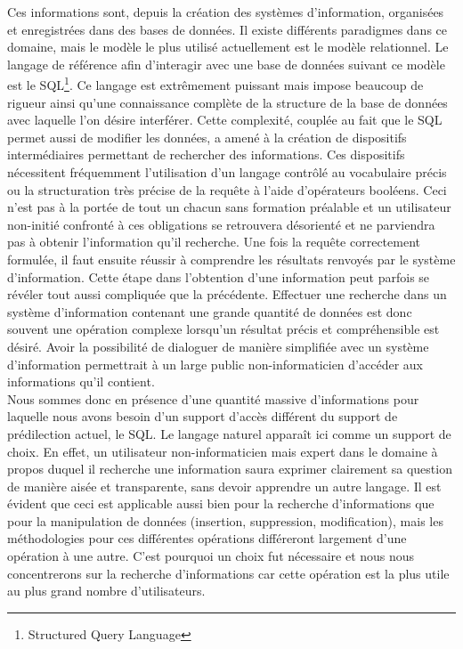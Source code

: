 \documentclass[a4paper,12pt]{article}
\begin{document}
Ces informations sont, depuis la création des systèmes d'information, organisées et enregistrées dans des bases de données.
Il existe différents paradigmes dans ce domaine, mais le modèle le plus utilisé actuellement est le modèle relationnel.
Le langage de référence afin d'interagir avec une base de données suivant ce modèle est le SQL\footnote{Structured Query Language}.
Ce langage est extrêmement puissant mais impose beaucoup de rigueur ainsi qu'une connaissance complète de la structure de la base de données avec laquelle l'on désire interférer.
Cette complexité, couplée au fait que le SQL permet aussi de modifier les données, a amené à la création de dispositifs intermédiaires permettant de rechercher des informations.
Ces dispositifs nécessitent fréquemment l'utilisation d'un langage contrôlé au vocabulaire précis ou la structuration très précise de la requête à l'aide d'opérateurs booléens. 
Ceci n'est pas à la portée de tout un chacun sans formation préalable et un utilisateur non-initié confronté à ces obligations se retrouvera désorienté et ne parviendra pas à obtenir l'information qu'il recherche. 
Une fois la requête correctement formulée, il faut ensuite réussir à comprendre les résultats renvoyés par le système d'information.
Cette étape dans l'obtention d'une information peut parfois se révéler tout aussi compliquée que la précédente.
Effectuer une recherche dans un système d'information contenant une grande quantité de données est donc souvent une opération complexe lorsqu'un résultat précis et compréhensible est désiré.
Avoir la possibilité de dialoguer de manière simplifiée avec un système d'information permettrait à un large public non-informaticien d'accéder aux informations qu'il contient. \\

Nous sommes donc en présence d'une quantité massive d'informations pour laquelle nous avons besoin d'un support d'accès différent du support de prédilection actuel, le SQL. 
Le langage naturel apparaît ici comme un support de choix.
En effet, un utilisateur non-informaticien mais expert dans le domaine à propos duquel il recherche une information saura exprimer clairement sa question de manière aisée et transparente, sans devoir apprendre un autre langage. 
Il est évident que ceci est applicable aussi bien pour la recherche d'informations que pour la manipulation de données (insertion, suppression, modification), mais les méthodologies pour ces différentes opérations différeront largement d'une opération à une autre.
C'est pourquoi un choix fut nécessaire et nous nous concentrerons sur la recherche d'informations car cette opération est la plus utile au plus grand nombre d'utilisateurs. \\
\end{document}
